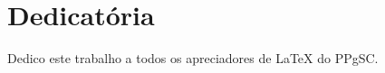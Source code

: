 \chapter*{Dedicatória}
  \vspace*{\fill}
  \noindent
  Dedico este trabalho a todos os apreciadores de \LaTeX{} do PPgSC.
  \vspace*{\fill}